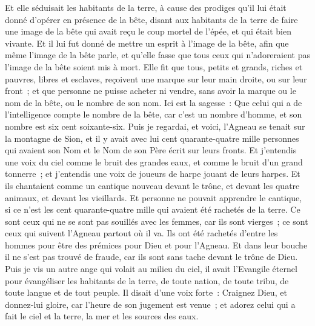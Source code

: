 \begin{multicols}{2}
Et elle séduisait les habitants de la terre, à cause des prodiges qu'il lui était donné d'opérer en présence de la bête, disant aux habitants de la terre de faire une image de la bête qui avait reçu le coup mortel de l'épée, et qui était bien vivante.
Et il lui fut donné de mettre un esprit à l'image de la bête, afin que même l'image de la bête parle, et qu'elle fasse que tous ceux qui n'adoreraient pas l'image de la bête soient mis à mort.
Elle fit que tous, petits et grands, riches et pauvres, libres et esclaves, reçoivent une marque sur leur main droite, ou sur leur front~;
et que personne ne puisse acheter ni vendre, sans avoir la marque ou le nom de la bête, ou le nombre de son nom.
Ici est la sagesse~: Que celui qui a de l'intelligence compte le nombre de la bête, car c'est un nombre d'homme, et son nombre est six cent soixante-six.
\VerseOne{}Puis je regardai, et voici, l'Agneau se tenait sur la montagne de Sion, et il y avait avec lui cent quarante-quatre mille personnes qui avaient son Nom et le Nom de son Père écrit sur leurs fronts.
Et j'entendis une voix du ciel comme le bruit des grandes eaux, et comme le bruit d'un grand tonnerre~; et j'entendis une voix de joueurs de harpe jouant de leurs harpes.
Et ils chantaient comme un cantique nouveau devant le trône, et devant les quatre animaux, et devant les vieillards. Et personne ne pouvait apprendre le cantique, si ce n'est les cent quarante-quatre mille qui avaient été rachetés de la terre.
Ce sont ceux qui ne se sont pas souillés avec les femmes, car ils sont vierges~; ce sont ceux qui suivent l'Agneau partout où il va. Ils ont été rachetés d'entre les hommes pour être des prémices pour Dieu et pour l'Agneau.
Et dans leur bouche il ne s'est pas trouvé de fraude, car ils sont sans tache devant le trône de Dieu.
Puis je vis un autre ange qui volait au milieu du ciel, il avait l'Evangile éternel pour évangéliser les habitants de la terre, de toute nation, de toute tribu, de toute langue et de tout peuple.
Il disait d'une voix forte~: Craignez Dieu, et donnez-lui gloire, car l'heure de son jugement est venue~; et adorez celui qui a fait le ciel et la terre, la mer et les sources des eaux.

\end{multicols}
